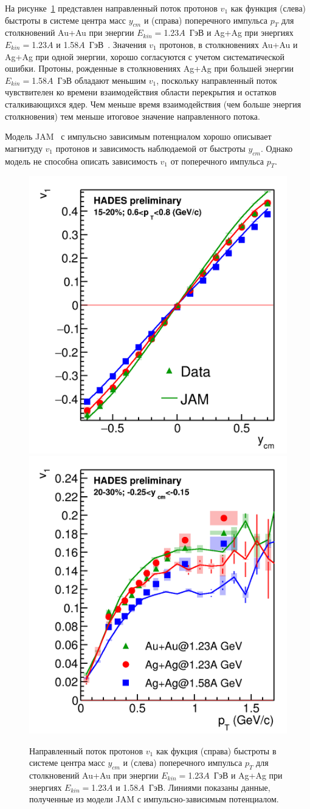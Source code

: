 На рисунке~\ref{fig:hades_v1_ycm_pT} представлен направленный поток протонов $v_1$ как функция (слева) быстроты в системе центра масс $y_{cm}$ и (справа) поперечного импульса $p_T$ для столкновений Au+Au при энергии $E_{kin}=$1.23$A$~ГэВ и Ag+Ag при энергиях $E_{kin}=$1.23$A$ и 1.58$A$~ГэВ~\cite{Mamaev:2024-1,Mamaev:2024-2}.
Значения $v_1$ протонов, в столкновениях Au+Au и Ag+Ag при одной энергии, хорошо согласуются с учетом систематической ошибки. 
Протоны, рожденные в столкновениях Ag+Ag при большей энергии $E_{kin}=$1.58$A$~ГэВ обладают меньшим $v_1$, поскольку направленный поток чувствителен ко времени взаимодействия области перекрытия и остатков сталкивающихся ядер.
Чем меньше время взаимодействия (чем больше энергия столкновения) тем меньше итоговое значение направленного потока.

Модель JAM~\cite{nara2019jam} с импульсно зависимым потенциалом хорошо описывает магнитуду $v_1$ протонов и зависимость наблюдаемой от быстроты $y_{cm}$.
Однако модель не способна описать зависимость $v_1$ от поперечного импульса $p_T$.
%
\begin{figure}[ht]
\begin{center}
\includegraphics[width=0.45\linewidth]{images/v1_hades_ycm.png}
\includegraphics[width=0.45\linewidth]{images/v1_hades_pT.png}
\caption{Направленный поток протонов $v_1$ как фукция (справа) быстроты в системе центра масс $y_{cm}$ и (слева) поперечного импульса $p_T$ для столкновений Au+Au при энергии $E_{kin}=$1.23$A$~ГэВ и Ag+Ag при энергиях $E_{kin}=$1.23$A$ и 1.58$A$~ГэВ. Линиями показаны данные, полученные из модели JAM с импульсно-зависимым потенциалом.}
\label{fig:hades_v1_ycm_pT}
\end{center}
\end{figure}

